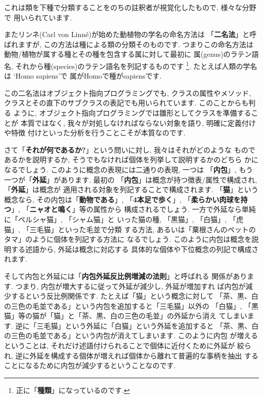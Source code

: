 これは類を下種で分類することをのちの註釈者が視覚化したもので, 様々な分野で
用いられています.
\newline

またリンネ(Carl von Linn\'e)が始めた動植物の学名の命名方法は
「\textbf{二名法}」と呼ばれますが, この方法は種による類の分類そのものです.
 つまりこの命名方法は動物/植物が属する種とその種を包含する属に対して最初に
属(genus)のラテン語名, それから種(species)のラテン語名を列記するものです
\footnote{正に「\textbf{種類}」になっているのです.}. たとえば人類の学名は
`Homo sapiens'で 属がHomoで種がsapiensです.
\newline

この二名法はオブジェクト指向プログラミングでも, クラスの属性やメソッド,
クラスとその直下のサブクラスの表記でも用いられています. このことからも判る
ように, オブジェクト指向プログラミングでは雛形としてクラスを準備することが
本質ではなく, 我々が対処しなければならない対象を語り, 明確に定義付けや特徴
付けといった分析を行うことこそが本質なのです.
\newline


さて「\textbf{それが何であるか?}」という問いに対し, 我々はそれがどのような
ものであるかを説明するか, そうでもなければ個体を列挙して説明するかのどちら
かになるでしょう. このように概念の表現には二通りの表現, 一つは
「\textbf{内包}」, もう一つが「\textbf{外延}」があります. 最初の
「\textbf{内包}」は概念が持つ徴表/属性で構成され,「\textbf{外延}」は概念が
適用される対象を列記することで構成されます. 「\textbf{猫}」という概念なら,
 その内包は「\textbf{動物である}」, 「\textbf{4本足で歩く}」,
 「\textbf{柔らかい肉球を持つ}」, 「\textbf{ニャオと鳴く}」等の属性から
構成されるでしょう. 一方で外延なら単純に「ペルシャ猫」, 「シャム猫」と
いった猫の種, 「黒猫」, 「白猫」, 「虎猫」, 「三毛猫」といった毛並で分類
する方法, あるいは「粟根さんのペットのタマ」のように個体を列記する方法に
なるでしょう. このように内包は概念を説明する述語から, 外延は概念に対応する
具体的な個体や下位概念の列記で構成されます.
\newline


そして内包と外延には「\textbf{内包外延反比例増減の法則}」と呼ばれる
関係があります. つまり, 内包が増大するに従って外延が減少し, 外延が増加すれ
ば内包が減少するという反比例関係です. たとえば「猫」という概念に対して
「茶、黒、白の三色の毛並である」という内包を追加すると「三毛猫」以外の
「白猫」, 「黒猫」等の猫が「猫」と「茶、黒、白の三色の毛並」の外延から消え
てしまいます. 逆に「三毛猫」という外延に「白猫」という外延を追加すると
「茶、黒、白の三色の毛並である」という内包が消えてしまいます. このように内包
が増えるということは, それだけ述語付けられることで個体に近付くために外延が
絞られ, 逆に外延を構成する個体が増えれば個体から離れて普遍的な事柄を抽出
することになるために内包が減少するということなのです.
\newline

